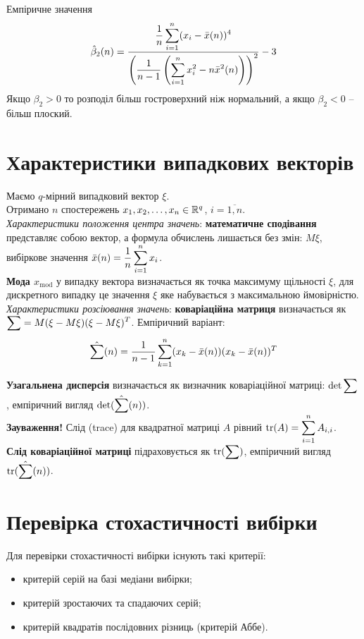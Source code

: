 Емпіричне значення 
\[ \hat{\beta}_2(n) = \dfrac{\dfrac{1}{n} \displaystyle\sum\limits_{i=1}^n(x_i - \bar{x}(n))^4 }{\left( \dfrac{1}{n-1} \left( \displaystyle\sum\limits_{i=1}^n x_i^2 - n \bar{x}^2(n) \right) \right)^2} - 3 \]
Якщо $\beta_2 > 0$ то розподіл більш гостроверхний ніж нормальний, а якщо $\beta_2 < 0$ -- більш плоский.

\section{Характеристики випадкових векторів}

Маємо $q$-мірний випадковий вектор $\xi$. \\

Отримано $n$ спостережень $x_1, x_2, \ldots, x_n \in \mathbb{R}^q$, $i=\overline{1,n}$. \\

\textit{Характеристики положення центра значень}: \textbf{математичне сподівання} представляє собою вектор, а формула обчислень лишається без змін: $M\xi$, вибіркове значення $\bar{x}(n) = \dfrac{1}{n} \displaystyle\sum\limits_{i=1}^n x_i$. \\

\textbf{Мода $x_{\text{mod}}$} у випадку вектора визначається як точка максимуму щільності $\xi$, для дискретного випадку це значення $\xi$ яке набувається з максимальною ймовірністю. \\

\textit{Характеристики розсіювання значень}: \textbf{коваріаційна матриця} визначається як $\displaystyle\sum\limits = M (\xi - M \xi) (\xi - M \xi)^T$. Емпіричний варіант: 
\[ \hat{\displaystyle\sum\limits}(n) = \dfrac{1}{n-1} \displaystyle\sum\limits_{k=1}^n (x_k - \bar{x}(n)) (x_k - \bar{x}(n))^T \] 

\textbf{Узагальнена дисперсія} визначається як визначник коваріаційної матриці: $\det \displaystyle\sum\limits$, емпіричний вигляд $\det (\hat{\displaystyle\sum\limits}(n))$. \\

\textbf{Зауваження!} Слід (trace) для квадратної матриці $A$ рівний $\text{tr} (A) = \displaystyle\sum\limits_{i=1}^n A_{i,i}$. \\

\textbf{Слід коваріаційної матриці} підраховується як $\text{tr} (\displaystyle\sum\limits)$, емпіричний вигляд $\text{tr} (\hat{\displaystyle\sum\limits}(n))$. 

\section{Перевірка стохастичності вибірки}

Для перевірки стохастичності вибірки існують такі критерії:
\begin{itemize}
    \item критерій серій на базі медіани вибірки;
    
    \item критерій зростаючих та спадаючих серій;
    
    \item критерій квадратів послідовних різниць (критерій Аббе).
\end{itemize}

